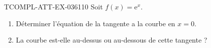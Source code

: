 \begin{exercice}{TCOMPL-ATT-EX-036}{1}{10}
Soit $f(x) = \mathrm{e}^x$.
\begin{enumerate}
  \item Déterminer l'équation de la tangente a la courbe en $x = 0$.
  \item La courbe est-elle au-dessus ou au-dessous de cette tangente ?
\end{enumerate}

\end{exercice}
